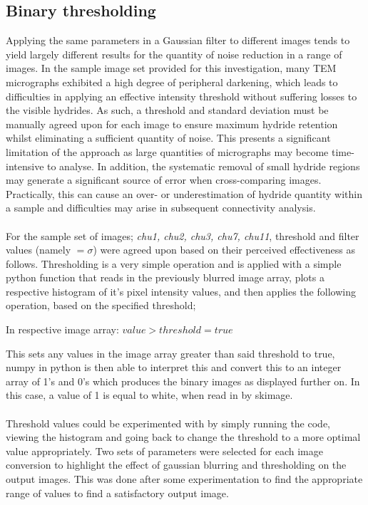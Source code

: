 \documentclass{article}
\begin{document}
	\subsection{Binary thresholding}
	Applying the same parameters in a Gaussian filter to different images tends to yield largely different results for the quantity of noise reduction in a range of images. In the sample image set provided for this investigation, many TEM micrographs exhibited a high degree of peripheral darkening, which leads to difficulties in applying an effective intensity threshold without suffering losses to the visible hydrides. As such, a threshold and standard deviation must be manually agreed upon for each image to ensure maximum hydride retention whilst eliminating a sufficient quantity of noise. This presents a significant limitation of the approach as large quantities of micrographs may become time-intensive to analyse. In addition, the systematic removal of small hydride regions may generate a significant source of error when cross-comparing images. Practically, this can cause an over- or underestimation of hydride quantity within a sample and difficulties may arise in subsequent connectivity analysis.
	\\ 
	\\
	For the sample set of images; \textit{chu1, chu2, chu3, chu7, chu11}, threshold and filter values (namely $=\sigma$) were agreed upon based on their perceived effectiveness as follows. Thresholding is a very simple operation and is applied with a simple python function that reads in the previously blurred image array, plots a respective histogram of it's pixel intensity values, and then applies the following operation, based on the specified threshold;
	\begin{center}
		In respective image array: $ value > threshold = true $
	\end{center}
	This sets any values in the image array greater than said threshold to true, numpy in python is then able to interpret this and convert this to an integer array of 1's and 0's which produces the binary images as displayed further on. In this case, a value of 1 is equal to white, when read in by skimage.
	\\
	\\
	Threshold values could be experimented with by simply running the code, viewing the histogram and going back to change the threshold to a more optimal value appropriately. Two sets of parameters were selected for each image conversion to highlight the effect of gaussian blurring and thresholding on the output images. This was done after some experimentation to find the appropriate range of values to find a satisfactory output image. 
	
\end{document}
